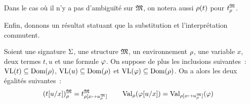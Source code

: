 \begin{notation}
  Dans le cas où il n'y a pas d'ambiguïté sur $\mathfrak{M}$, on notera aussi
  $\rho(t)$ pour $t^{\mathfrak{M}}_{\rho}$.
\end{notation}

\noindent
Enfin, donnons un résultat statuant que la substitution et l'interprétation
commutent.

\begin{proposition}\label{prop.comm.subst.env}
  Soient une signature $\Sigma$, une structure $\mathfrak{M}$, un environnement
  $\rho$, une variable $x$, deux termes $t,u$ et une formule $\varphi$. On
  suppose de plus les inclusions suivantes~: $\operatorname{VL}(t)\subseteq \operatorname{Dom}(\rho)$,
  $\operatorname{VL}(u)\subseteq\operatorname{Dom}(\rho)$ et $\operatorname{VL}(\varphi)\subseteq\operatorname{Dom}(\rho)$. On a alors
  les deux égalités suivantes~:
  \[(t[u/x])^{\mathfrak{M}}_{\rho} = t^{\mathfrak{M}}_{\rho[x \mapsto u^{\mathfrak{M}}_{\rho}]} \qquad
  \operatorname{Val}_{\rho}(\varphi[u/x]) = \operatorname{Val}_{\rho[x\mapsto u^{\mathfrak{M}}_{\rho}]}(\varphi)\]
\end{proposition}

